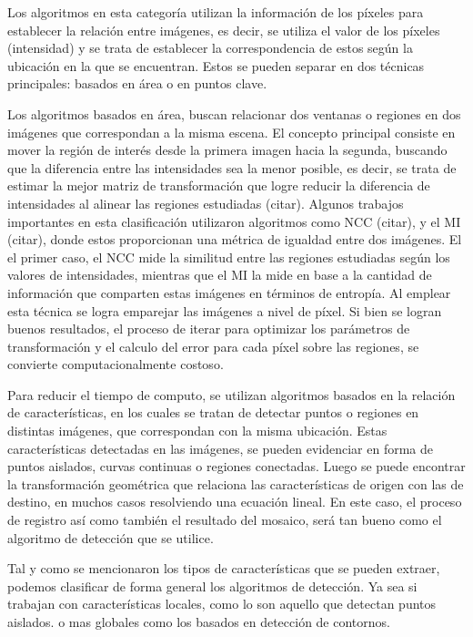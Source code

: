 Los algoritmos en esta categoría utilizan la información de los píxeles para establecer la relación entre imágenes, es decir, se utiliza el valor de los píxeles (intensidad) y se trata de establecer la correspondencia de estos según la ubicación en la que se encuentran. Estos se pueden separar en dos técnicas principales: basados en área o en puntos clave.


Los algoritmos basados en área, buscan relacionar dos ventanas o regiones en dos imágenes que correspondan a la misma escena. El concepto principal consiste en mover la región de interés desde la primera imagen hacia la segunda, buscando que la diferencia entre las intensidades sea la menor posible, es decir,  se trata de estimar la mejor matriz de transformación que logre reducir la diferencia de intensidades al alinear las regiones estudiadas (citar). Algunos trabajos importantes en esta clasificación utilizaron algoritmos como NCC (citar), y el MI (citar), donde estos proporcionan una métrica de igualdad entre dos imágenes. El el primer caso, el NCC mide la similitud entre las regiones estudiadas según los valores de intensidades, mientras que el MI la mide en base a la cantidad de información que comparten estas imágenes en términos de entropía. Al emplear esta técnica se logra emparejar las imágenes a nivel de píxel. Si bien se logran buenos resultados, el proceso de iterar para optimizar los parámetros de transformación y el calculo del error para cada píxel sobre las regiones, se convierte computacionalmente costoso.





Para reducir el tiempo de computo, se utilizan algoritmos basados en la relación de características, en los cuales se tratan de detectar puntos o regiones en distintas imágenes, que correspondan con la misma ubicación. Estas características detectadas en las imágenes, se pueden evidenciar en forma de puntos aislados, curvas continuas o regiones conectadas. Luego se puede encontrar la transformación geométrica que relaciona las características de origen con las de destino, en muchos casos resolviendo una ecuación lineal. En este caso, el proceso de registro así como también el resultado del mosaico, será tan bueno como el algoritmo de detección que se utilice.

Tal y como se mencionaron los tipos de características que se pueden extraer, podemos clasificar de forma general los algoritmos de detección. Ya sea si trabajan con características locales, como lo son aquello que detectan puntos aislados. o mas globales como los basados en detección de contornos.

